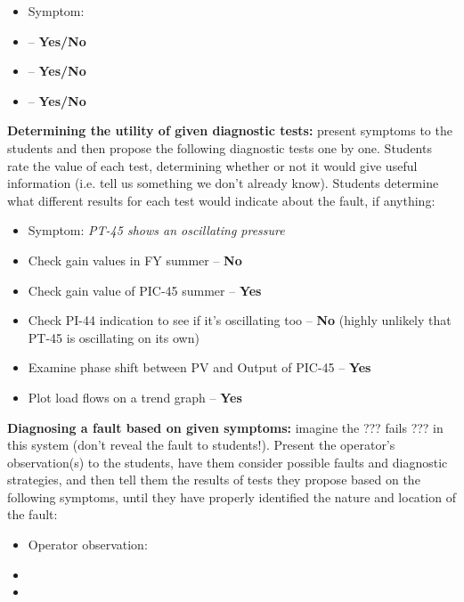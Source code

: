 \begin{itemize}
\item{} Symptom: {\it }
\item{}  -- {\bf Yes/No}
\item{}  -- {\bf Yes/No}
\item{}  -- {\bf Yes/No}
\end{itemize}


\vskip 10pt

\filbreak


\noindent
{\bf Determining the utility of given diagnostic tests:} present symptoms to the students and then propose the following diagnostic tests one by one.  Students rate the value of each test, determining whether or not it would give useful information (i.e. tell us something we don't already know).  Students determine what different results for each test would indicate about the fault, if anything:

\begin{itemize}
\item{} Symptom: {\it PT-45 shows an oscillating pressure}
\item{} Check gain values in FY summer -- {\bf No}
\item{} Check gain value of PIC-45 summer -- {\bf Yes}
\item{} Check PI-44 indication to see if it's oscillating too -- {\bf No} (highly unlikely that PT-45 is oscillating on its own)
\item{} Examine phase shift between PV and Output of PIC-45 -- {\bf Yes}
\item{} Plot load flows on a trend graph -- {\bf Yes}
\end{itemize}


\vskip 10pt


\noindent
{\bf Diagnosing a fault based on given symptoms:} imagine the ??? fails ??? in this system (don't reveal the fault to students!).  Present the operator's observation(s) to the students, have them consider possible faults and diagnostic strategies, and then tell them the results of tests they propose based on the following symptoms, until they have properly identified the nature and location of the fault:

\begin{itemize}
\item{} Operator observation: {\it }
\item{} 
\item{} 
\end{itemize}



